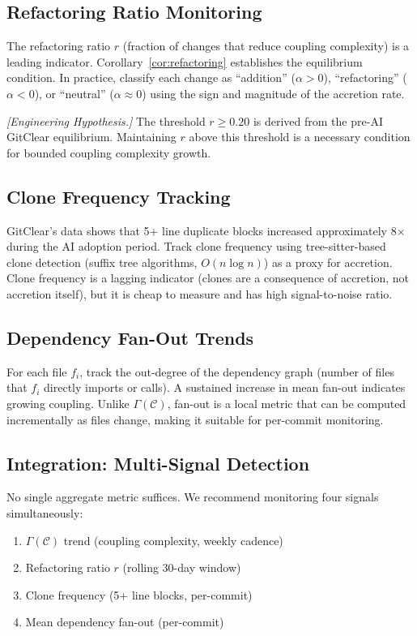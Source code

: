 \documentclass[11pt, a4paper, logo, copyright]{googledeepmind}
\begin{document}
\subsection{Refactoring Ratio Monitoring}

The refactoring ratio $r$ (fraction of changes that reduce coupling complexity) is a leading indicator. Corollary~\ref{cor:refactoring} establishes the equilibrium condition. In practice, classify each change as ``addition'' ($\alpha > 0$), ``refactoring'' ($\alpha < 0$), or ``neutral'' ($\alpha \approx 0$) using the sign and magnitude of the accretion rate.

\emph{[Engineering Hypothesis.]} The threshold $r \geq 0.20$ is derived from the pre-AI GitClear equilibrium. Maintaining $r$ above this threshold is a necessary condition for bounded coupling complexity growth.

\subsection{Clone Frequency Tracking}

GitClear's data shows that 5+ line duplicate blocks increased approximately 8$\times$ during the AI adoption period. Track clone frequency using tree-sitter-based clone detection (suffix tree algorithms, $O(n \log n)$) as a proxy for accretion. Clone frequency is a lagging indicator (clones are a consequence of accretion, not accretion itself), but it is cheap to measure and has high signal-to-noise ratio.

\subsection{Dependency Fan-Out Trends}

For each file $f_i$, track the out-degree of the dependency graph (number of files that $f_i$ directly imports or calls). A sustained increase in mean fan-out indicates growing coupling. Unlike $\Gamma(\mathcal{C})$, fan-out is a local metric that can be computed incrementally as files change, making it suitable for per-commit monitoring.

\subsection{Integration: Multi-Signal Detection}

No single aggregate metric suffices. We recommend monitoring four signals simultaneously:

\begin{enumerate}[nosep]
    \item $\Gamma(\mathcal{C})$ trend (coupling complexity, weekly cadence)
    \item Refactoring ratio $r$ (rolling 30-day window)
    \item Clone frequency (5+ line blocks, per-commit)
    \item Mean dependency fan-out (per-commit)
\end{enumerate}
\end{document}
